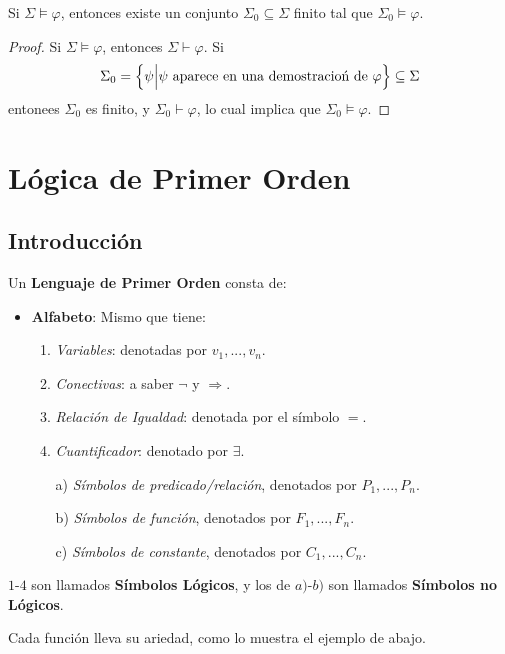 \documentclass[12pt]{report}
\newcounter{it}
\theoremstyle{largebreak}
\begin{document}
    \begin{cor}
        Si $\Sigma\vDash\varphi$, entonces existe un conjunto $\Sigma_0\subseteq\Sigma$ finito tal que $\Sigma_0\vDash\varphi$.
    \end{cor}

    \begin{proof}
        Si $\Sigma\vDash\varphi$, entonces $\Sigma\vdash\varphi$. Si
        \begin{equation*}
            \Sigma_0=\left\{\psi\Big|\psi\textup{ aparece en una demostracioń de }\varphi \right\}\subseteq\Sigma
        \end{equation*}
        entonees $\Sigma_0$ es finito, y $\Sigma_0\vdash\varphi$, lo cual implica que $\Sigma_0\vDash\varphi$.
    \end{proof}

    \chapter{Lógica de Primer Orden}

    \section{Introducción}

    \begin{mydef}
        Un \textbf{Lenguaje de Primer Orden} consta de:
        \begin{itemize}
            \item \textbf{Alfabeto}: Mismo que tiene:
            \begin{enumerate}
                \item \textit{Variables}: denotadas por $v_1,...,v_n$.
                \item \textit{Conectivas}: a saber $\neg$ y $\Rightarrow$.
                \item \textit{Relación de Igualdad}: denotada por el símbolo $=$.
                \item \textit{Cuantificador}: denotado por $\exists$.
                \item[a)] \textit{Símbolos de predicado/relación}, denotados por $P_1,...,P_n$.
                \item[b)] \textit{Símbolos de función}, denotados por $F_1,...,F_n$.
                \item[c)] \textit{Símbolos de constante}, denotados por $C_1,...,C_n$.
            \end{enumerate}
        \end{itemize}
        $1$-$4$ son llamados \textbf{Símbolos Lógicos}, y los de $a)$-$b)$ son llamados \textbf{Símbolos no Lógicos}.

        Cada función lleva su ariedad, como lo muestra el ejemplo de abajo.
    \end{mydef}
\end{document}
